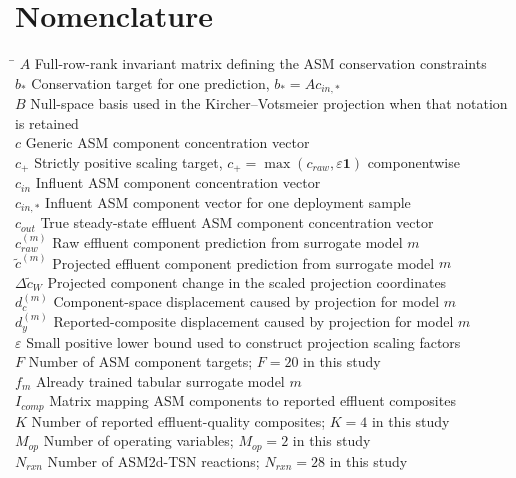 \documentclass[a4paper,fleqn]{cas-sc}
\begin{document}
\section*{Nomenclature}
\begin{tabbing}
\hspace{3.9cm} \= \kill
$A$ \> Full-row-rank invariant matrix defining the ASM conservation constraints \\
$b_*$ \> Conservation target for one prediction, $b_* = A c_{in,*}$ \\
$B$ \> Null-space basis used in the Kircher--Votsmeier projection when that notation is retained \\
$c$ \> Generic ASM component concentration vector \\
$c_+$ \> Strictly positive scaling target, $c_+ = \max(c_{raw},\varepsilon\mathbf{1})$ componentwise \\
$c_{in}$ \> Influent ASM component concentration vector \\
$c_{in,*}$ \> Influent ASM component vector for one deployment sample \\
$c_{out}$ \> True steady-state effluent ASM component concentration vector \\
$c_{raw}^{(m)}$ \> Raw effluent component prediction from surrogate model $m$ \\
$\tilde{c}^{(m)}$ \> Projected effluent component prediction from surrogate model $m$ \\
$\Delta\tilde{c}_W$ \> Projected component change in the scaled projection coordinates \\
$d_c^{(m)}$ \> Component-space displacement caused by projection for model $m$ \\
$d_y^{(m)}$ \> Reported-composite displacement caused by projection for model $m$ \\
$\varepsilon$ \> Small positive lower bound used to construct projection scaling factors \\
$F$ \> Number of ASM component targets; $F=20$ in this study \\
$f_m$ \> Already trained tabular surrogate model $m$ \\
$I_{comp}$ \> Matrix mapping ASM components to reported effluent composites \\
$K$ \> Number of reported effluent-quality composites; $K=4$ in this study \\
$M_{op}$ \> Number of operating variables; $M_{op}=2$ in this study \\
$N_{rxn}$ \> Number of ASM2d-TSN reactions; $N_{rxn}=28$ in this study \\

\end{tabbing}
\end{document}
